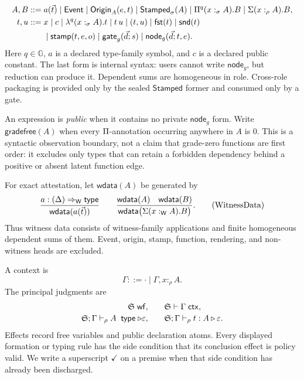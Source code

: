 \documentclass[11pt]{article}
\numberwithin{equation}{section}
\theoremstyle{definition}
\theoremstyle{plain}
\theoremstyle{remark}
\newcommand{\Type}{\mathsf{type}}
\newcommand{\Event}{\mathsf{Event}}
\newcommand{\Origin}{\mathsf{Origin}}
\newcommand{\Stamped}{\mathsf{Stamped}}
\newcommand{\Wit}{\mathsf W}
\newcommand{\Gd}{\mathbb G}
\newcommand{\eps}{\varepsilon}
\newcommand{\jtype}{\mathrel{\mathsf{type}}}
\newcommand{\ctx}{\mathsf{ctx}}
\newcommand{\wf}{\mathsf{wf}}
\newcommand{\fst}{\AFFst}
\newcommand{\snd}{\AFSnd}
\begin{document}
\begin{align*}
A,B ::={}&
  a(\vec t)
  \mid \Event
  \mid \Origin_A(e,t)
  \mid \Stamped_\sigma(A)
  \mid \AFDepFun^q(x:_{\sigma}A).B
  \mid \AFDepPair(x:_{\rho}A).B,
\\
t,u ::={}&
  x\mid c\mid
  \lambda^q(x:_{\sigma}A).t\mid t\,u\mid
  (t,u)\mid\fst(t)\mid\snd(t)\\
 &\mid \mathsf{stamp}(t,e,o)
  \mid \mathsf{gate}_g(\vec d;s)
  \mid \mathsf{node}_g(\vec d;t,e).
\end{align*}
Here \(q\in\Gd\), \(a\) is a declared type-family symbol, and \(c\) is a
declared public constant.  The last form is internal syntax: users cannot
write \(\mathsf{node}_g\), but reduction can produce it.  Dependent sums are
homogeneous in role.  Cross-role packaging is provided only by the sealed
\(\Stamped\) former and consumed only by a gate.

An expression is \emph{public} when it contains no private
\(\mathsf{node}_g\) form.  Write \(\mathsf{gradefree}(A)\) when every
\(\Pi\)-annotation occurring anywhere in \(A\) is \(0\).  This is a
syntactic observation boundary, not a claim that grade-zero functions are
first order: it excludes only types that can retain a forbidden dependency
behind a positive or absent latent function edge.

For exact attestation, let \(\mathsf{wdata}(A)\) be generated by
\[
\frac{
 a:(\Delta)\Rightarrow_{\Wit}\Type
}{
 \mathsf{wdata}(a(\vec t))
}
\qquad
\frac{
 \mathsf{wdata}(A)\quad\mathsf{wdata}(B)
}{
 \mathsf{wdata}\bigl(\AFDepPair(x:_{\Wit}A).B\bigr)
}.
\tag{WitnessData}
\]
Thus witness data consists of witness-family applications and finite
homogeneous dependent sums of them.  Event, origin, stamp, function,
rendering, and non-witness heads are excluded.

A context is
\[
  \Gamma ::= \cdot\mid\Gamma,x:_{\rho}A.
\]
The principal judgments are
\[
\begin{array}{rcl}
\AFDeclSignature\;\wf,&&
\AFDeclSignature\vdash\Gamma\;\ctx,\\[2pt]
\AFDeclSignature;\Gamma\vdash_{\rho} A\;\jtype\triangleright\eps,&&
\AFDeclSignature;\Gamma\vdash_{\rho} t:A\triangleright\eps.
\end{array}
\]
Effects record free variables and public declaration atoms.  Every displayed
formation or typing rule has the side condition that its conclusion effect is
policy valid.  We write a superscript \(\checkmark\) on a premise when that
side condition has already been discharged.
\end{document}
